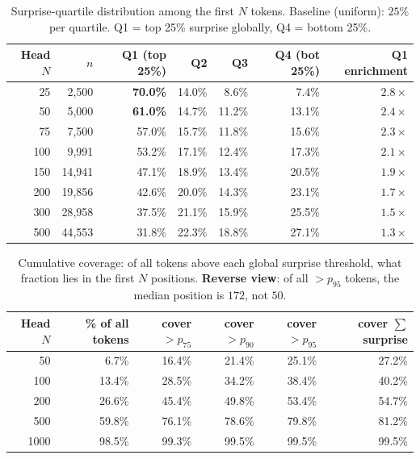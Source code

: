 \documentclass[10pt]{article}
\begin{document}
\begin{table}[h]
\centering
\caption{Surprise-quartile distribution among the first $N$ tokens. Baseline (uniform): $25\%$ per quartile. Q1 = top 25\% surprise globally, Q4 = bottom 25\%.}
\small
\begin{tabular}{@{}rrrrrrr@{}}
\toprule
\textbf{Head $N$} & \textbf{$n$} & \textbf{Q1 (top 25\%)} & \textbf{Q2} & \textbf{Q3} & \textbf{Q4 (bot 25\%)} & \textbf{Q1 enrichment} \\
\midrule
25  &  2{,}500 & \textbf{70.0\%} & 14.0\% &  8.6\% &  7.4\% & $2.8\times$ \\
50  &  5{,}000 & \textbf{61.0\%} & 14.7\% & 11.2\% & 13.1\% & $2.4\times$ \\
75  &  7{,}500 & 57.0\% & 15.7\% & 11.8\% & 15.6\% & $2.3\times$ \\
100 &  9{,}991 & 53.2\% & 17.1\% & 12.4\% & 17.3\% & $2.1\times$ \\
150 & 14{,}941 & 47.1\% & 18.9\% & 13.4\% & 20.5\% & $1.9\times$ \\
200 & 19{,}856 & 42.6\% & 20.0\% & 14.3\% & 23.1\% & $1.7\times$ \\
300 & 28{,}958 & 37.5\% & 21.1\% & 15.9\% & 25.5\% & $1.5\times$ \\
500 & 44{,}553 & 31.8\% & 22.3\% & 18.8\% & 27.1\% & $1.3\times$ \\
\bottomrule
\end{tabular}
\end{table}

\begin{table}[h]
\centering
\caption{Cumulative coverage: of all tokens above each global surprise threshold, what fraction lies in the first $N$ positions. \textbf{Reverse view}: of all $>p_{95}$ tokens, the median position is $172$, not $50$.}
\small
\begin{tabular}{@{}rrrrrr@{}}
\toprule
\textbf{Head $N$} & \textbf{\% of all tokens} & \textbf{cover $>p_{75}$} & \textbf{cover $>p_{90}$} & \textbf{cover $>p_{95}$} & \textbf{cover $\sum$ surprise} \\
\midrule
50   &  6.7\% & 16.4\% & 21.4\% & 25.1\% & 27.2\% \\
100  & 13.4\% & 28.5\% & 34.2\% & 38.4\% & 40.2\% \\
200  & 26.6\% & 45.4\% & 49.8\% & 53.4\% & 54.7\% \\
500  & 59.8\% & 76.1\% & 78.6\% & 79.8\% & 81.2\% \\
1000 & 98.5\% & 99.3\% & 99.5\% & 99.5\% & 99.5\% \\
\bottomrule
\end{tabular}
\end{table}
\end{document}
